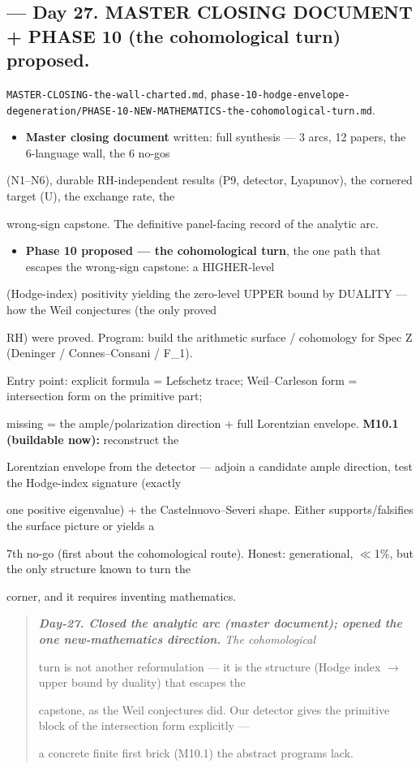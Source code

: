 \documentclass[10pt]{article}
\begin{document}
\subsection*{ --- Day 27. MASTER CLOSING DOCUMENT + PHASE 10 (the cohomological turn) proposed.}
\texttt{MASTER-CLOSING-the-wall-charted.md}, \texttt{phase-10-hodge-envelope-degeneration/PHASE-10-NEW-MATHEMATICS-the-cohomological-turn.md}.\par
\begin{itemize}
\item \textbf{Master closing document} written: full synthesis --- 3 arcs, 12 papers, the 6-language wall, the 6 no-gos
\end{itemize}
  (N1--N6), durable RH-independent results (P9, detector, Lyapunov), the cornered target (U), the exchange rate, the\par
  wrong-sign capstone. The definitive panel-facing record of the analytic arc.\par
\begin{itemize}
\item \textbf{Phase 10 proposed --- the cohomological turn}, the one path that escapes the wrong-sign capstone: a HIGHER-level
\end{itemize}
  (Hodge-index) positivity yielding the zero-level UPPER bound by DUALITY --- how the Weil conjectures (the only proved\par
  RH) were proved. Program: build the arithmetic surface / cohomology for Spec Z (Deninger / Connes--Consani / F\_1).\par
  Entry point: explicit formula = Lefschetz trace; Weil--Carleson form = intersection form on the primitive part;\par
  missing = the ample/polarization direction + full Lorentzian envelope. \textbf{M10.1 (buildable now):} reconstruct the\par
  Lorentzian envelope from the detector --- adjoin a candidate ample direction, test the Hodge-index signature (exactly\par
  one positive eigenvalue) + the Castelnuovo--Severi shape. Either supports/falsifies the surface picture or yields a\par
  7th no-go (first about the cohomological route). Honest: generational, \ensuremath{\ll}1\%, but the only structure known to turn the\par
  corner, and it requires inventing mathematics.\par

\begin{quote}\itshape
\textbf{Day-27. Closed the analytic arc (master document); opened the one new-mathematics direction.} The cohomological\par
turn is not another reformulation --- it is the structure (Hodge index \ensuremath{\to} upper bound by duality) that escapes the\par
capstone, as the Weil conjectures did. Our detector gives the primitive block of the intersection form explicitly ---\par
a concrete finite first brick (M10.1) the abstract programs lack.\par
\end{quote}
\end{document}
